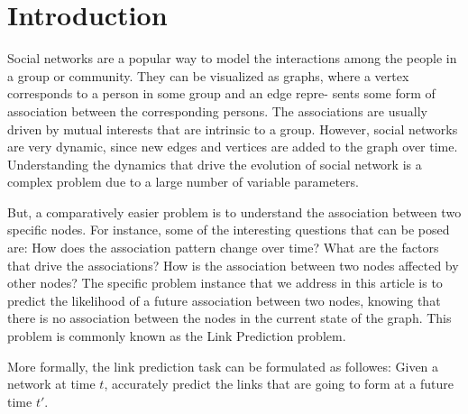 \documentclass{acm_proc_article-sp}
\begin{document}



\section{Introduction}
\label{Sect.1}

Social networks are a popular way to model the interactions among
the people in a group or community. They can be visualized as graphs,
where a vertex corresponds to a person in some group and an edge repre-
sents some form of association between the corresponding persons. The
associations are usually driven by mutual interests that are intrinsic to a
group. However, social networks are very dynamic, since new edges and
vertices are added to the graph over time. Understanding the dynamics
that drive the evolution of social network is a complex problem due to a
large number of variable parameters.

But, a comparatively easier problem is to understand the association between two specific nodes. For
instance, some of the interesting questions that can be posed are: How
does the association pattern change over time? What are the factors
that drive the associations? How is the association between two nodes
affected by other nodes? The specific problem instance that we address
in this article is to predict the likelihood of a future association between
two nodes, knowing that there is no association between the nodes in
the current state of the graph. This problem is commonly known as the
Link Prediction problem.



More formally, the link prediction task can be formulated as followes: Given a network at time $t$, accurately predict the links that are going to form at a future time $t'$. 
\end{document}
